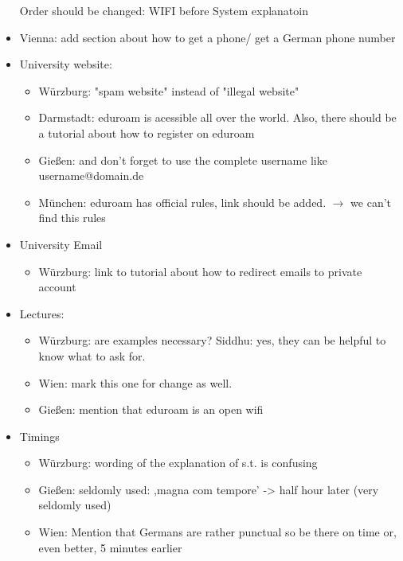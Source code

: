 \begin{itemize}
        Order should be changed: WIFI before System explanatoin
        \item Vienna: add section about how to get a phone/ get a German phone number
        \item University website:
          \begin{itemize}
            \item Würzburg: "spam website" instead of "illegal website"
            \item Darmstadt: eduroam is acessible all over the world. Also, there should be a tutorial about how to register on eduroam
            \item Gießen: and don't forget to use the complete username like username@domain.de
            \item München: eduroam has official rules, link should be added. $\rightarrow$ we can't find this rules
          \end{itemize}
        \item University Email
          \begin{itemize}
            \item Würzburg: link to tutorial about how to redirect emails to private account
          \end{itemize}

        \item Lectures:
          \begin{itemize}
            \item Würzburg: are examples necessary? Siddhu: yes, they can be helpful to know what to ask for.
            \item Wien: mark this one for change as well.
            \item Gießen: mention that eduroam is an open wifi
          \end{itemize}

        \item Timings
          \begin{itemize}
            \item Würzburg: wording of the explanation of s.t. is confusing
            \item Gießen: seldomly used: ,magna com tempore' -> half hour later (very seldomly used)
            \item Wien: Mention that Germans are rather punctual so be there on time or, even better, 5 minutes earlier
          \end{itemize}


\end{itemize}
